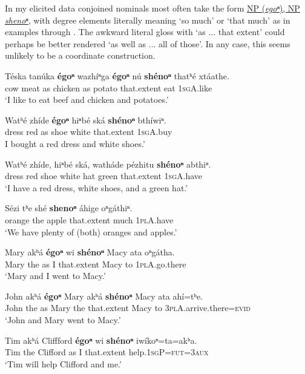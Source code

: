 \documentclass[output=paper]{LSP/langsci}
\begin{document}
In my elicited data conjoined nominals most often take the form \underline{NP (\textit{egoⁿ}), NP} \underline{\textit{shenoⁿ}}, with degree elements literally meaning `so much' or `that much' as in examples  through . The awkward literal gloss with `as ... that extent' could perhaps be better rendered `as well as ... all of those'. In any case, this seems unlikely to be a coordinate construction.

\begin{exe}
\ex
\gll T\'eska 	tan\'uka 	\textbf{\'egoⁿ} 	wazh\'iⁿga 	\textbf{\'egoⁿ}	n\'u \textbf{sh\'enoⁿ} thatʰ\'e  xt\'aathe.\\
	cow   	meat    	as     	chicken   	as     	potato 	that.extent 	eat      	\textsc{1sgA}.like\\
\trans `I like to eat beef and chicken and potatoes.'    
 
 \ex
\gll Watʰ\'e 	zh\'ide 	\textbf{\'egoⁿ} 	hiⁿb\'e 	sk\'a    \textbf{	sh\'enoⁿ}  	bth\'iwiⁿ.\\
	dress   	red  	as   	shoe 	white 	that.extent 	\textsc{1sgA}.buy\\
\trans I bought a red dress and white shoes.'  

\ex
\gll Watʰ\'e  zh\'ide,  hiⁿb\'e	sk\'a,  wath\'ade  p\'ezhitu \textbf{sh\'enoⁿ} abthiⁿ.\\ 
dress   	red   	shoe 	white 	hat  	green 	that.extent 	\textsc{1sgA}.have \\
\trans `I have a red dress, white shoes, and a green hat.'   

\ex
\gll S\'ezi  	tʰe 	sh\'e  	\textbf{shenoⁿ} 	\'ahige 	oⁿg\'athiⁿ. \\
	orange 	the 	apple 	that.extent 	much  	\textsc{1plA}.have \\
\trans `We have plenty of (both) oranges and apples.'

\ex
\gll Mary akʰ\'a  	\textbf{\'egoⁿ} wi \textbf{sh\'enoⁿ} Macy ata oⁿg\'atha. \\
 Mary	the  as  	I 	that.extent  	Macy to 	\textsc{1plA}.go.there \\
\trans `Mary and I went to Macy.'

\ex
\gll John akʰ\'a \textbf{\'egoⁿ} Mary akʰ\'a \textbf{sh\'enoⁿ} Macy ata ah\'i=tʰe. \\
 John the 	as  Mary the 	that.extent  Macy to \textsc{3plA}.arrive.there=\textsc{evid} \\
\trans `John and Mary went to Macy.'
 
\ex 
\gll Tim akʰ\'a Cliffford \textbf{\'egoⁿ} wi \textbf{sh\'enoⁿ} iw\'ikoⁿ=ta=akʰa. \\
Tim the Clifford as 	I  that.extent  help.\textsc{1sgP}=\textsc{fut=3aux} \\
\trans `Tim will help Clifford and me.'
\end{exe}
\end{document}
